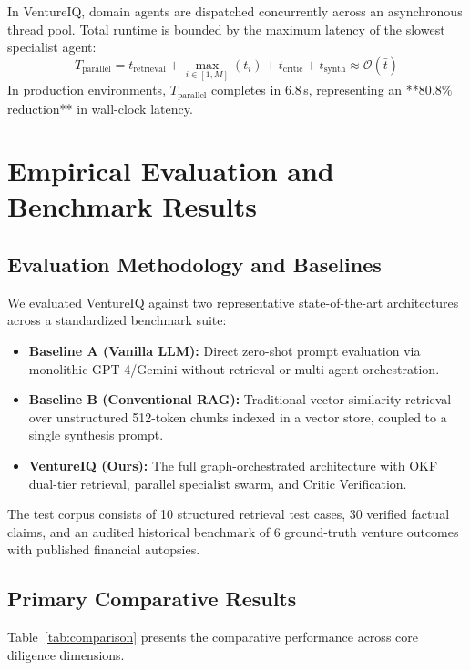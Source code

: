 \documentclass[conference]{IEEEtran}
\begin{document}
In VentureIQ, domain agents are dispatched concurrently across an asynchronous thread pool. Total runtime is bounded by the maximum latency of the slowest specialist agent:
\begin{equation}
T_{\text{parallel}} = t_{\text{retrieval}} + \max_{i \in [1, M]}(t_i) + t_{\text{critic}} + t_{\text{synth}} \approx \mathcal{O}(\bar{t})
\end{equation}
In production environments, $T_{\text{parallel}}$ completes in $6.8$\,s, representing an **$80.8\%$ reduction** in wall-clock latency.

\section{Empirical Evaluation and Benchmark Results}

\subsection{Evaluation Methodology and Baselines}
We evaluated VentureIQ against two representative state-of-the-art architectures across a standardized benchmark suite:
\begin{itemize}
    \item \textbf{Baseline A (Vanilla LLM):} Direct zero-shot prompt evaluation via monolithic GPT-4/Gemini without retrieval or multi-agent orchestration.
    \item \textbf{Baseline B (Conventional RAG):} Traditional vector similarity retrieval over unstructured 512-token chunks indexed in a vector store, coupled to a single synthesis prompt.
    \item \textbf{VentureIQ (Ours):} The full graph-orchestrated architecture with OKF dual-tier retrieval, parallel specialist swarm, and Critic Verification.
\end{itemize}

The test corpus consists of 10 structured retrieval test cases, 30 verified factual claims, and an audited historical benchmark of 6 ground-truth venture outcomes with published financial autopsies.

\subsection{Primary Comparative Results}
Table~\ref{tab:comparison} presents the comparative performance across core diligence dimensions.
\end{document}
